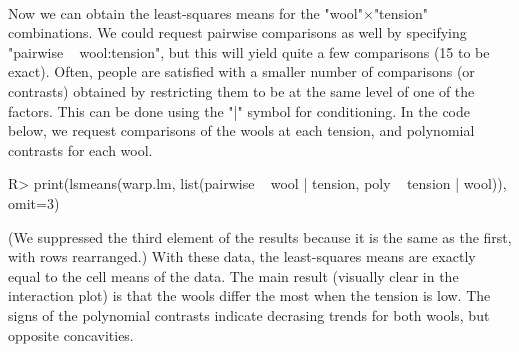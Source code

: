 \documentclass{article}
\begin{document}
\\
Now we can obtain the least-squares means for the "wool"$\times$"tension" combinations. We could request pairwise comparisons as well by specifying "pairwise ~ wool:tension", but this will yield quite a few comparisons (15 to be exact). Often, people are satisfied with a smaller number of comparisons (or contrasts) obtained by restricting them to be at the same level of one of the factors. This can be done using the "|" symbol for conditioning. In the code below, we request comparisons of the wools at each tension, and polynomial contrasts for each wool.
\begin{Winput}
R> print(lsmeans(warp.lm, list(pairwise ~ wool | tension,  poly ~ tension | wool)), omit=3)
\end{Winput}
(We suppressed the third element of the results because it is the same as the first, with rows rearranged.)
With these data, the least-squares means are exactly equal to the cell means of the data.
The main result (visually clear in the interaction plot) is that the wools differ the most when the tension is low. The signs of the polynomial contrasts indicate decrasing trends for both wools, but opposite concavities.
\end{document}
